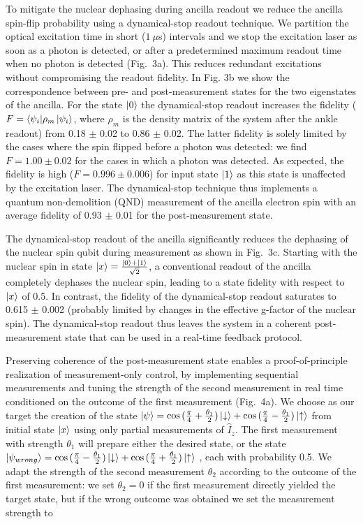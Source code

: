 To mitigate the nuclear dephasing during ancilla readout we reduce the ancilla spin-flip probability using a dynamical-stop readout technique. We partition the optical excitation time in short ($1~ \mu$s) intervals and we stop the excitation laser as soon as a photon is detected, or after a predetermined maximum readout time when no photon is detected (Fig.~3a). This reduces redundant excitations without compromising the readout fidelity. In Fig. 3b we show the correspondence between pre- and post-measurement states for the two eigenstates of the ancilla. For the state $\left|0\right\rangle$ the dynamical-stop readout increases the fidelity ($F = \langle \psi_i|\rho_m \left|\psi_i\right\rangle$, where $\rho_m$ is the density matrix of the system after the ankle readout) from 0.18 $\pm$ 0.02 to 0.86 $\pm$ 0.02. The latter fidelity is solely limited by the cases where the spin flipped before a photon was detected: we find $F = 1.00 \pm 0.02$ for the cases in which a photon was detected. As expected, the fidelity is high ($F = 0.996 \pm 0.006$) for input state $\left|1\right\rangle$ as this state is unaffected by the excitation laser. The dynamical-stop technique thus implements a quantum non-demolition (QND) measurement of the ancilla electron spin with an average fidelity of 0.93 $\pm$ 0.01 for the post-measurement state.

The dynamical-stop readout of the ancilla significantly reduces the dephasing of the nuclear spin qubit during measurement as shown in Fig.~3c. Starting with the nuclear spin in state $\left|x\right\rangle = \frac{\left|0\right\rangle + \left|1\right\rangle}{\sqrt{2}}$, a conventional readout of the ancilla completely dephases the nuclear spin, leading to a state fidelity with respect to $\left|x\right\rangle$ of 0.5. In contrast, the fidelity of the dynamical-stop readout saturates to 0.615 $\pm$ 0.002 (probably limited by changes in the effective g-factor of the nuclear spin). The dynamical-stop readout thus leaves the system in a coherent post-measurement state that can be used in a real-time feedback protocol. 

Preserving coherence of the post-measurement state enables a proof-of-principle realization of measurement-only control, by implementing sequential measurements and tuning the strength of the second measurement in real time conditioned on the outcome of the first measurement (Fig.~4a). We choose as our target the creation of the state $\left|\psi\right\rangle = \cos{(\frac{\pi}{4}+\frac{\theta_1}{2})}\left|\downarrow\right\rangle+\cos{(\frac{\pi}{4}-\frac{\theta_1}{2})}\left|\uparrow\right\rangle$ from initial state $\left|x\right\rangle$ using only partial measurements of $\hat{I}_z$. The first measurement with strength $\theta_1$ will prepare either the desired state, or the state $\left|\psi_{wrong}\right\rangle =  \cos{(\frac{\pi}{4}-\frac{\theta_1}{2})}\left|\downarrow\right\rangle+\cos{(\frac{\pi}{4}+\frac{\theta_1}{2})}\left|\uparrow\right\rangle$ , each with probability 0.5. We adapt the strength of the second measurement $\theta_2$ according to the outcome of the first measurement: we set $\theta_2 = 0$ if the first measurement directly yielded the target state, but if the wrong outcome was obtained we set the measurement strength to

